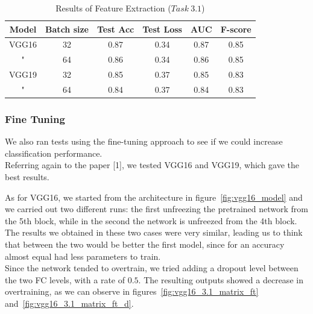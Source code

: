 \documentclass[11pt,a4paper,oneside]{article}
\begin{document}
\begin{table}[h]
\centering
\begin{tabular}{|cc|cccc|}
\hline
Model & Batch size & Test Acc & Test Loss & AUC & F-score \\
\hline
VGG16 & 32 & 0.87 & 0.34 & 0.87 & 0.85 \\
" & 64 & 0.86 & 0.34 & 0.86 & 0.85 \\
VGG19 & 32 & 0.85 & 0.37 & 0.85 & 0.83  \\
" & 64 & 0.84 & 0.37 & 0.84 & 0.83 \\
\hline
\end{tabular}
\caption{Results of Feature Extraction ($Task\ 3.1$)}
\label{tab:task3.1_fe}
\end{table}


\clearpage

\subsubsection{Fine Tuning}
We also ran tests using the fine-tuning approach to see if we could increase classification performance. \\
Referring again to the paper [1], we tested VGG16 and VGG19, which gave the best results.

As for VGG16, we started from the architecture in figure~\ref{fig:vgg16_model} and we carried out two different runs: the first unfreezing the pretrained network from the 5th block, while in the second the network is unfreezed from the 4th block. The results we obtained in these two cases were very similar, leading us to think that between the two would be better the first model, since for an accuracy almost equal had less parameters to train. \\
Since the network tended to overtrain, we tried adding a dropout level between the two FC levels, with a rate of $0.5$. The resulting outputs showed a decrease in overtraining, as we can observe in figures~\ref{fig:vgg16_3.1_matrix_ft} and~\ref{fig:vgg16_3.1_matrix_ft_d}. 
\end{document}
